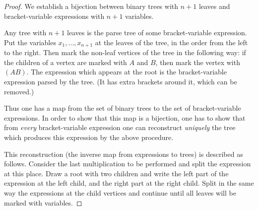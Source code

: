 

\setcounter{section}{4}
\setcounter{subsection}{3}
\setcounter{dfn}{5}

\begin{proof}
We establish a bijection between binary trees with $n+1$ leaves and bracket-variable expressions with $n+1$ variables.

Any tree with $n+1$ leaves is the parse tree of some bracket-variable expression.
Put the variables $x_1, \ldots, x_{n+1}$ at the leaves of the tree, in the order from the left to the right.
Then mark the non-leaf vertices of the tree in the following way:
if the children of a vertex are marked with $A$ and $B$, then mark the vertex with $(AB)$.
The expression which appears at the root is the bracket-variable expression parsed by the tree.
(It has extra brackets around it, which can be removed.)

Thus one has a map from the set of binary trees to the set of bracket-variable expressions.
In order to show that this map is a bijection, one has to show that from \emph{every} bracket-variable expression
one can reconstruct \emph{uniquely} the tree which produces this expression by the above procedure.

This reconstruction (the inverse map from expressions to trees) is described as follows.
Consider the last multiplication to be performed and split the expression at this place.
Draw a root with two children and write the left part of the expression at the left child, and the right part at the right child.
Split in the same way the expressions at the child vertices and continue until all leaves will be marked with variables.
\end{proof}





